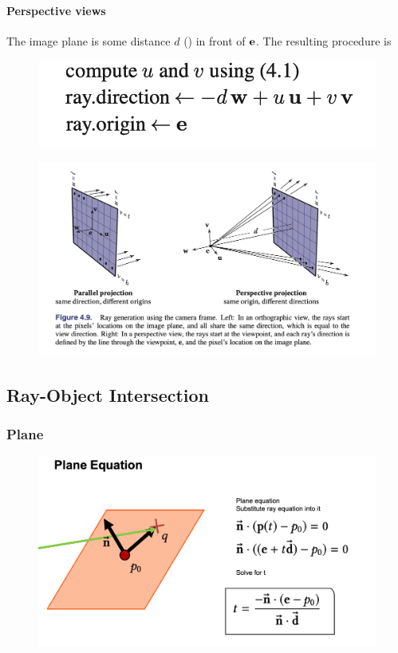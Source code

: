 \documentclass[11pt]{article}
\numberwithin{equation}{section}
\begin{document}
\paragraph{Perspective views}
The image plane is some distance $d$ () in front of $\textbf{e}$. The resulting procedure is
	\begin{figure}[H]
	\centering
	\includegraphics[scale=0.5]{p29}
	\end{figure}
	\begin{figure}[H]
	\centering
	\includegraphics[scale=0.4]{p28}
	\end{figure}
	
\subsection{Ray-Object Intersection}
\subsubsection{Plane}
	\begin{figure}[H]
	\centering
	\includegraphics[scale=0.4]{p30}
	\end{figure}
	
\end{document}
